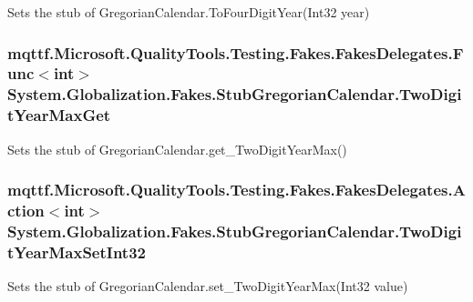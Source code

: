 Sets the stub of Gregorian\-Calendar.\-To\-Four\-Digit\-Year(\-Int32 year)

\hypertarget{class_system_1_1_globalization_1_1_fakes_1_1_stub_gregorian_calendar_a6580218503b01b40c1bd3198062feaf0}{
\subsubsection[{Two\-Digit\-Year\-Max\-Get}]{\setlength{\rightskip}{0pt plus 5cm}mqttf.\-Microsoft.\-Quality\-Tools.\-Testing.\-Fakes.\-Fakes\-Delegates.\-Func$<$int$>$ System.\-Globalization.\-Fakes.\-Stub\-Gregorian\-Calendar.\-Two\-Digit\-Year\-Max\-Get}}\label{class_system_1_1_globalization_1_1_fakes_1_1_stub_gregorian_calendar_a6580218503b01b40c1bd3198062feaf0}


Sets the stub of Gregorian\-Calendar.\-get\-\_\-\-Two\-Digit\-Year\-Max()

\hypertarget{class_system_1_1_globalization_1_1_fakes_1_1_stub_gregorian_calendar_a568c27760a91e34802c94216b02abc8d}{
\subsubsection[{Two\-Digit\-Year\-Max\-Set\-Int32}]{\setlength{\rightskip}{0pt plus 5cm}mqttf.\-Microsoft.\-Quality\-Tools.\-Testing.\-Fakes.\-Fakes\-Delegates.\-Action$<$int$>$ System.\-Globalization.\-Fakes.\-Stub\-Gregorian\-Calendar.\-Two\-Digit\-Year\-Max\-Set\-Int32}}\label{class_system_1_1_globalization_1_1_fakes_1_1_stub_gregorian_calendar_a568c27760a91e34802c94216b02abc8d}


Sets the stub of Gregorian\-Calendar.\-set\-\_\-\-Two\-Digit\-Year\-Max(\-Int32 value)



